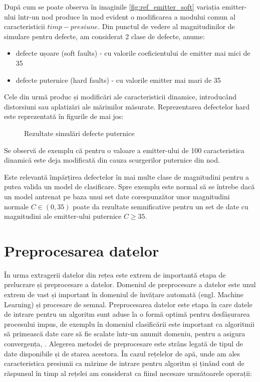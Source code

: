 După cum se poate observa în imaginile \ref{fig:ref_emitter_soft} variația emitter-ului într-un nod produce în mod evident o modificarea a modului comun al caracteristicii $timp-presiune$. Din punctul de vedere al magnitudinilor de simulare pentru defecte, am considerat 2 clase de defecte, anume:
\begin{itemize}
\item defecte ușoare (soft faults) - cu valorile coeficientului de emitter mai mici de 35
\item defecte puternice (hard faults) - cu valorile emitter mai mari de 35 
\end{itemize}

Cele din urmă produc și modificări ale caracteristicii dinamice, introducând distorsiuni sau aplatizări ale mărimilor măsurate. Reprezentarea defectelor hard este reprezentată în figurile de mai jos:

\begin{figure}[H]

\qquad
{}
\caption{Rezultate simulări defecte puternice}
\label{fig:ref_emitter_hard}
\end{figure}

Se observă de exemplu că pentru o valoare a emitter-ului de 100 caracteristica dinamică este deja modificată din cauza scurgerilor puternice din nod. 

Este relevantă împărțirea defectelor în mai multe clase de magnitudini pentru a putea valida un model de clasificare. Spre exemplu este normal să se întrebe dacă un model antrenat pe baza unui set date corespunzător unor magnitudini normale $C \in (0, 35)$ poate da rezultate semnificative pentru un set de date cu magnitudini ale emitter-ului puternice $C \geqslant 35$. 

\section{Preprocesarea datelor}
\label{sec:preproc}
În urma extragerii datelor din rețea este extrem de importantă etapa de prelucrare și preprocesare a datelor. Domeniul de preprocesare a datelor este unul extrem de vast și important în domeniul de învățare automată (engl. Machine Learning) și procesare de semnal. Preprocesarea datelor este etapa în care datele de intrare pentru un algoritm sunt aduse la o formă optimă pentru desfășurarea procesului impus, de exemplu în domeniul clasificării este important ca algoritmii să primească date care să fie scalate într-un anumit domeniu, pentru a asigura convergența\cite{dataPreprocessing}, \cite{GIGO}. Alegerea metodei de preprocesare este strâns legată de tipul de date disponibile și de starea acestora. În cazul rețelelor de apă, unde am ales caracteristica presiunii ca mărime de intrare pentru algoritm și ținând cont de răspunsul în timp al rețelei am considerat ca fiind necesare următoarele operații:

